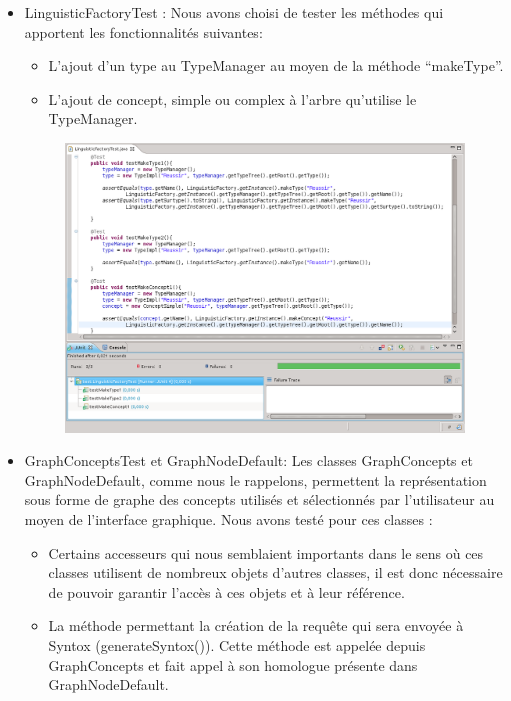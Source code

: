 \documentclass[12pt]{report}
\begin{document}
\begin{itemize}
\begin{figure}[h!]
\begin{center}
\end{center}
\end{figure}
\item LinguisticFactoryTest : Nous avons choisi de tester les méthodes qui apportent les fonctionnalités suivantes: 
	\begin{itemize}
	\item L'ajout d'un type au TypeManager au moyen de la méthode ``makeType''.
	\item L'ajout de concept, simple ou complex à l'arbre qu'utilise le TypeManager.
	\end{itemize}
\newpage
\begin{figure}[h!]
\begin{center}
	\includegraphics[scale=0.40]{resultatTest4.png}
\end{center}
\end{figure}
\item GraphConceptsTest et GraphNodeDefault: Les classes GraphConcepts et GraphNodeDefault, comme nous le rappelons, permettent la représentation sous forme de graphe des concepts utilisés et sélectionnés par l'utilisateur au moyen de l'interface graphique. 
Nous avons testé pour ces classes :
	\begin{itemize}
	\item Certains accesseurs qui nous semblaient importants dans le sens où ces classes utilisent de nombreux objets d'autres classes, il est donc nécessaire de pouvoir garantir l'accès à ces objets et à leur référence. 
	\item La méthode permettant la création de la requête qui sera envoyée à Syntox (generateSyntox()). Cette méthode est appelée depuis GraphConcepts et fait appel à son homologue présente dans GraphNodeDefault.
	\end{itemize}
\end{itemize}
\end{document}
